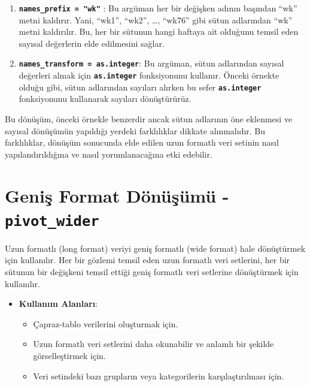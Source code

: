 \documentclass[
  letterpaper,
  DIV=11,
  numbers=noendperiod]{scrreprt}
\begin{document}
\begin{tcolorbox}
\begin{enumerate}
\def\labelenumi{\arabic{enumi}.}
\item
  \textbf{\texttt{names\_prefix\ =\ "wk"}} : Bu argüman her bir değişken
  adının başından ``wk'' metni kaldırır. Yani, ``wk1'', ``wk2'', \ldots,
  ``wk76'' gibi sütun adlarından ``wk'' metni kaldırılır. Bu, her bir
  sütunun hangi haftaya ait olduğunu temsil eden sayısal değerlerin elde
  edilmesini sağlar.
\item
  \textbf{\texttt{names\_transform\ =\ as.integer}}: Bu argüman, sütun
  adlarından sayısal değerleri almak için \textbf{\texttt{as.integer}}
  fonksiyonunu kullanır. Önceki örnekte olduğu gibi, sütun adlarından
  sayıları alırken bu sefer \textbf{\texttt{as.integer}} fonksiyonunu
  kullanarak sayıları dönüştürürüz.
\end{enumerate}

Bu dönüşüm, önceki örnekle benzerdir ancak sütun adlarının öne eklenmesi
ve sayısal dönüşümün yapıldığı yerdeki farklılıklar dikkate alınmalıdır.
Bu farklılıklar, dönüşüm sonucunda elde edilen uzun formatlı veri
setinin nasıl yapılandırıldığına ve nasıl yorumlanacağına etki edebilir.

\end{tcolorbox}

\section*{\texorpdfstring{Geniş Format Dönüşümü -
\texttt{pivot\_wider}}{Geniş Format Dönüşümü - pivot\_wider}}\label{geniux15f-format-duxf6nuxfcux15fuxfcmuxfc---pivot_wider}


Uzun formatlı (long format) veriyi geniş formatlı (wide format) hale
dönüştürmek için kullanılır. Her bir gözlemi temsil eden uzun formatlı
veri setlerini, her bir sütunun bir değişkeni temsil ettiği geniş
formatlı veri setlerine dönüştürmek için kullanılır.

\begin{itemize}
\item
  \textbf{Kullanım Alanları}:

  \begin{itemize}
  \item
    Çapraz-tablo verilerini oluşturmak için.
  \item
    Uzun formatlı veri setlerini daha okunabilir ve anlamlı bir şekilde
    görselleştirmek için.
  \item
    Veri setindeki bazı grupların veya kategorilerin karşılaştırılması
    için.
  \end{itemize}
\end{itemize}
\end{document}
